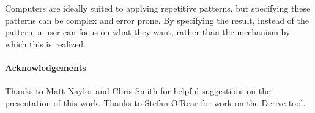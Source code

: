\documentclass{llncs}
\begin{document}
Computers are ideally suited to applying repetitive patterns, but specifying these patterns can be complex and error prone. By specifying the result, instead of the pattern, a user can focus on what they want, rather than the mechanism by which this is realized.

\paragraph{Acknowledgements}

Thanks to Matt Naylor and Chris Smith for helpful suggestions on the presentation of this work. Thanks to Stefan O'Rear for work on the Derive tool.



\end{document}
